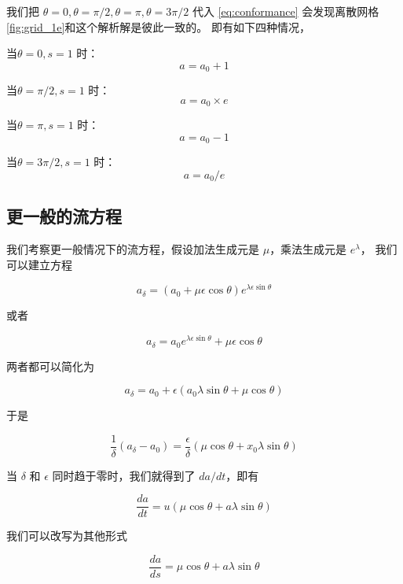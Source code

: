 \documentclass[a4paper,12pt]{article}
\numberwithin{definition}{section}
\numberwithin{lemma}{section}
\numberwithin{proposition}{section}
\numberwithin{theorem}{section}
\numberwithin{grammar}{section}
\numberwithin{program}{section}
\numberwithin{convention}{section}
\numberwithin{corollary}{section}
\begin{document}
我们把 $ \theta=0, \theta=\pi/2, \theta=\pi, \theta=3\pi/2 $ 代入 \eqref{eq:conformance} 会发现离散网格\ref{fig:grid_1e}和这个解析解是彼此一致的。
即有如下四种情况，

当$ \theta=0, s=1 $ 时：
$$
a =  a_0 + 1
$$

当$ \theta=\pi/2, s=1 $ 时：
$$
a =  a_0 \times e
$$

当$ \theta=\pi, s=1 $ 时：
$$
a =  a_0 - 1
$$

当$ \theta=3\pi/2, s=1 $ 时：
$$
a = a_0 / e
$$

\subsection{更一般的流方程}

我们考察更一般情况下的流方程，假设加法生成元是 $\mu$，乘法生成元是 $e^\lambda$， 我们可以建立方程

\begin{equation}
    a_{\delta} = (a_0 + \mu \epsilon \cos \theta)e^{\lambda \epsilon \sin \theta}
\end{equation}

或者

\begin{equation}
    a_{\delta} = a_0 e^{\lambda \epsilon \sin \theta} + \mu \epsilon \cos \theta
\end{equation}

两者都可以简化为

\begin{equation}
    a_{\delta} = a_0 + \epsilon (a_0 \lambda \sin \theta + \mu \cos \theta)
\end{equation}

于是

\begin{equation}
    \frac{1}{\delta} (a_{\delta} - a_0) = \frac{\epsilon}{\delta} (\mu \cos \theta + x_0 \lambda \sin \theta)
\end{equation}

当 $\delta$ 和 $\epsilon$ 同时趋于零时，我们就得到了 $da / dt$，即有

\begin{equation}
    \frac{da}{dt} = u (\mu \cos \theta + a \lambda \sin \theta)
\end{equation}

我们可以改写为其他形式

\begin{equation}
    \frac{da}{ds} = \mu \cos \theta + a \lambda \sin \theta\label{eq:flow}
\end{equation}
\end{document}
